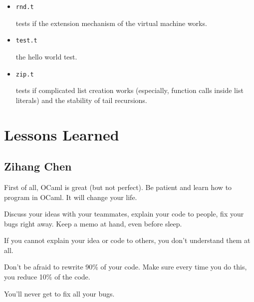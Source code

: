 \documentclass{report}
\begin{document}
\begin{itemize}
\item \texttt{rnd.t}

tests if the extension mechanism of the virtual machine works.

\item \texttt{test.t}

the hello world test.

\item \texttt{zip.t}

tests if complicated list creation works (especially, function calls inside list literals) and the stability of tail recursions.

\end{itemize}

\chapter{Lessons Learned}

\section{Zihang Chen}

First of all, OCaml is great (but not perfect). Be patient and learn how to program in OCaml. It will change your life.

Discuss your ideas with your teammates, explain your code to people, fix your bugs right away. Keep a memo at hand, even before sleep.

If you cannot explain your idea or code to others, you don't understand them at all.

Don't be afraid to rewrite 90\% of your code. Make sure every time you do this, you reduce 10\% of the code.

You'll never get to fix all your bugs.
\end{document}
